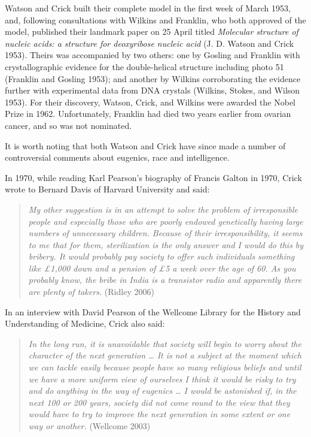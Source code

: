 \documentclass[
]{book}
\begin{document}
Watson and Crick built their complete model in the first week of March 1953, and, following consultations with Wilkins and Franklin, who both approved of the model, published their landmark paper on 25 April titled \emph{Molecular structure of nucleic acids: a structure for deoxyribose nucleic acid} (J. D. Watson and Crick 1953). Theirs was accompanied by two others: one by Gosling and Franklin with crystallographic evidence for the double-helical structure including photo 51 (Franklin and Gosling 1953); and another by Wilkins corroborating the evidence further with experimental data from DNA crystals (Wilkins, Stokes, and Wilson 1953). For their discovery, Watson, Crick, and Wilkins were awarded the Nobel Prize in 1962. Unfortunately, Franklin had died two years earlier from ovarian cancer, and so was not nominated.

It is worth noting that both Watson and Crick have since made a number of controversial comments about eugenics, race and intelligence.

In 1970, while reading Karl Pearson's biography of Francis Galton in 1970, Crick wrote to Bernard Davis of Harvard University and said:

\begin{quote}
\emph{My other suggestion is in an attempt to solve the problem of irresponsible people and especially those who are poorly endowed genetically having large numbers of unnecessary children. Because of their irresponsibility, it seems to me that for them, sterilization is the only answer and I would do this by bribery. It would probably pay society to offer such individuals something like £1,000 down and a pension of £5 a week over the age of 60. As you probably know, the bribe in India is a transistor radio and apparently there are plenty of takers.} (Ridley 2006)
\end{quote}

In an interview with David Pearson of the Wellcome Library for the History and Understanding of Medicine, Crick also said:

\begin{quote}
\emph{In the long run, it is unavoidable that society will begin to worry about the character of the next generation \ldots{} It is not a subject at the moment which we can tackle easily because people have so many religious beliefs and until we have a more uniform view of ourselves I think it would be risky to try and do anything in the way of eugenics \ldots{} I would be astonished if, in the next 100 or 200 years, society did not come round to the view that they would have to try to improve the next generation in some extent or one way or another.} (Wellcome 2003)
\end{quote}
\end{document}
